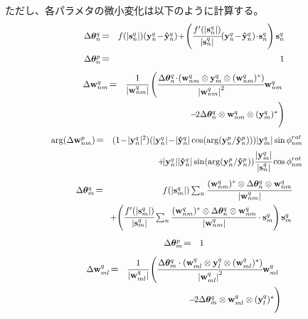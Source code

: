 \documentclass[a4j, twocolumn]{jsarticle}
\begin{document}
ただし、各パラメタの微小変化は以下のように計算する。
\begin{eqnarray}
	\scalebox{0.87}{$\Delta\bm{\theta}^q_{n}$}&\!=\!&\scalebox{0.87}{$f(|{\bf s}^q_{n}|)({\bf y}^q_{n}\!-\!{\bf \hat{y}}^q_{n}) \!+\!\left(\cfrac{f'(|{\bf s}^q_{n}|)}{|{\bf s}^q_{n}|} ({\bf y}^q_{n}\!-\!{\bf \hat{y}}^q_{n})\!\cdot\!{\bf s}^q_{n}\right){\bf s}^q_{n}$}\\
	\scalebox{0.87}{$\Delta\bm{\theta}^p_{n}$}&\!=\!&\scalebox{0.87}{$1$}
\end{eqnarray}
\begin{eqnarray}
	\scalebox{0.87}{$\Delta{\bf w}^q_{nm}$}&\!=\!&\scalebox{0.87}{$\cfrac{1}{|{\bf w}^q_{nm}|}\left( \cfrac{\Delta\bm{\theta}^q_{n} \!\cdot\! ({\bf w}^q_{nm} \otimes {\bf y}^q_{m} \otimes ({\bf w}_{nm}^{q})^{*})}{{|{\bf w}^q_{nm}|}^{2}}{\bf w}^q_{nm} \right. \Biggl.$} \nonumber\\
	&& \scalebox{0.87}{$\!-\! 2\Delta\bm{\theta}^q_{n} \otimes {\bf w}^q_{nm} \otimes ({\bf y}_{m}^{q})^{*}\Biggr)$}
\end{eqnarray}
\begin{eqnarray}
\hspace{-0.5cm}
	\scalebox{0.87}{$\arg(\Delta{\bf w}^p_{nm})$}&\!=\!&\scalebox{0.87}{$(1\!-\!|{\bf y}^q_{n}|^2)(|{\bf y}^q_{n}|\!-\!|{\bf \hat{y}}^q_{n}| \cos(\arg({\bf y}^p_{n} / {\bf \hat{y}}^p_{n})))|{\bf y}^q_{m}|\sin\mbox{$\phi$}^{rot}_{nm}$} \nonumber\\
	&& \scalebox{0.87}{$\!+\! |{\bf y}^q_{n}| |{\bf \hat{y}}^q_{n}|\sin(\arg({\bf y}^p_{n} / {\bf \hat{y}}^p_{n}))\cfrac{|{\bf y}^q_{m}|}{|{\bf s}^q_{n}|}\cos\mbox{$\phi$}^{rot}_{nm}$}
\end{eqnarray}
\begin{eqnarray}
	\scalebox{0.87}{$\Delta\bm{\theta}^q_{m}$}&\!=\!&\scalebox{0.87}{$f(|{\bf s}^q_{m}|)\sum_{n} \cfrac{({\bf w}_{nm}^{q})^{*} \otimes \Delta\bm{\theta}^q_{n} \otimes {\bf w}^q_{nm}}{{|{\bf w}^q_{nm}|}}$} \nonumber \\
	&& \scalebox{0.87}{$\!+\! \left(\cfrac{f'(|{\bf s}^q_{m}|)}{|{\bf s}^q_{m}|}\sum_{n} \cfrac{({\bf w}_{nm}^{q})^{*} \otimes \Delta\bm{\theta}^q_{n} \otimes {\bf w}^q_{nm}}{{|{\bf w}^q_{nm}|}} \cdot {\bf s}^q_{m}\right){\bf s}^q_{m}$} \nonumber \\
\end{eqnarray}
\begin{eqnarray}
	\scalebox{0.87}{$\Delta\bm{\theta}^p_{m}$}&\!=\!&\scalebox{0.87}{$1$}
\end{eqnarray}
\begin{eqnarray}
	\scalebox{0.87}{$\Delta{\bf w}^q_{ml}$}&\!=\!&\scalebox{0.87}{$\cfrac{1}{|{\bf w}^q_{ml}|}\left( \cfrac{\Delta\bm{\theta}^q_{m}\cdot({\bf w}^q_{ml} \otimes {\bf y}^q_{l} \otimes ({\bf w}_{ml}^{q})^{*})}{{|{\bf w}^q_{ml}|}^{2}}{\bf w}^q_{ml} \right.\Biggl.$} \nonumber \\
	&& \scalebox{0.87}{$\!-\! 2\Delta\bm{\theta}^q_{m} \otimes {\bf w}^q_{ml} \otimes ({\bf y}_{l}^{q})^{*}\Biggr)$} 
\end{eqnarray}
\end{document}
